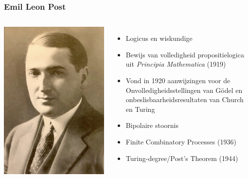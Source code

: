 \documentclass[handout]{beamer}
\begin{document}
\begin{frame}{}
    \frametitle{Emil Leon Post}
    \begin{columns}
        \includegraphics[height=0.8\textheight]{Post.jpg}
        {\small
        \begin{itemize}
            \item<2-> Logicus en wiskundige
            \item<3-> Bewijs van volledigheid propositielogica uit \emph{Principia Mathematica} (1919) 
            \item<4-> Vond in 1920 aanwijzingen voor de Onvolledigheidsstellingen van Gödel 
            en onbeslisbaarheidsresultaten van Church en Turing
            \item<5-> Bipolaire stoornis
            \item<6-> Finite Combinatory Processes (1936)
            \item<7-> Turing-degree/Post's Theorem (1944)
        \end{itemize}
        }
    \end{columns}        
\end{frame}
\end{document}
